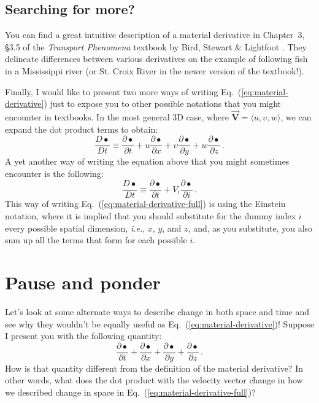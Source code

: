 \begin{mdframed}[style=exercise-frame]

\subsection*{Searching for more?}

You can find a great intuitive description of a material derivative in Chapter~3, \S3.5 of the \textit{Transport Phenomena} textbook by Bird, Stewart \& Lightfoot \cite{bird2002transport}. They delineate differences between various derivatives on the example of following fish in a Mississippi river (or St. Croix River in the newer version of the textbook!).

\end{mdframed}

Finally, I would like to present two more ways of writing Eq.~(\ref{eq:material-derivative}) just to expose you to other possible notations that you might encounter in textbooks. 
In the most general 3D case, where $\vec{\bm{V}} = \langle u, \upsilon, w \rangle$, we can expand the dot product terms to obtain:
\begin{equation} \label{eq:material-derivative-full}
\frac{D \bullet}{D t} \equiv \frac{\partial \bullet}{\partial t} + u \frac{\partial \bullet}{\partial x} + \upsilon \frac{\partial \bullet}{\partial y} + w \frac{\partial \bullet}{\partial z} \, .
\end{equation}
A yet another way of writing the equation above that you might sometimes encounter is the following:
\begin{equation} \label{eq:material-derivative-ein stein}
\frac{D \bullet}{D t} \equiv \frac{\partial \bullet}{\partial t} + V_i \frac{\partial \bullet}{\partial i} \, .
\end{equation}
This way of writing Eq.~(\ref{eq:material-derivative-full}) is using the Einstein notation, where it is implied that you should substitute for the dummy index $i$ every possible spatial dimension, \textit{i.e.}, $x$, $y$, and $z$, and, as you substitute, you also sum up all the terms that form for each possible $i$.

\section{Pause and ponder}

Let's look at some alternate ways to describe change in both space and time and see why they wouldn't be equally useful as Eq.~(\ref{eq:material-derivative})! Suppose I present you with the following quantity:
\begin{equation} \label{eq:all-derivatives}
\frac{\partial \bullet}{\partial t} + \frac{\partial \bullet}{\partial x} + \frac{\partial \bullet}{\partial y} + \frac{\partial \bullet}{\partial z} \, .
\end{equation}
How is that quantity different from the definition of the material derivative? In other words, what does the dot product with the velocity vector change in how we described change in space in Eq.~(\ref{eq:material-derivative-full})?

